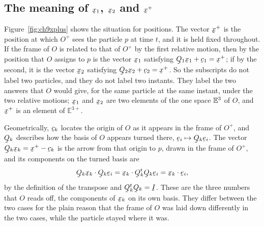 \subsection*{The meaning of $\bx_{1}$, $\bx_{2}$ and $\bx^{+}$}

Figure~\ref{fig:ch9xplus} shows the situation for positions. The vector
$\bx^{+}$ is the position at which $O^{+}$ sees the particle $p$ at time
$t$, and it is held fixed throughout. If the frame of $O$ is related to
that of $O^{+}$ by the first relative motion, then by  the
position that $O$ assigns to $p$ is the vector $\bx_{1}$ satisfying
$\bQ_{1}\bx_{1}+\bc_{1}=\bx^{+}$; if by the second, it is the vector
$\bx_{2}$ satisfying $\bQ_{2}\bx_{2}+\bc_{2}=\bx^{+}$. So the subscripts
do not label two particles, and they do not label two instants. They
label the two answers that $O$ would give, for the same particle at the
same instant, under the two relative motions; $\bx_{1}$ and $\bx_{2}$
are two elements of the one space $\mathbb{E}^{3}$ of $O$, and $\bx^{+}$ is an
element of $\mathbb{E}^{3+}$.

Geometrically, $\bc_{k}$ locates the origin of $O$ as it appears in the
frame of $O^{+}$, and $\bQ_{k}$ describes how the basis of $O$ appears
turned there, $\be_{i}\mapsto\bQ_{k}\be_{i}$. The vector $\bQ_{k}\bx_{k}
=\bx^{+}-\bc_{k}$ is the arrow from that origin to $p$, drawn in the
frame of $O^{+}$, and its components on the turned basis are
\[
   \ip{\bQ_{k}\bx_{k}}{\bQ_{k}\be_{i}}
   =\ip{\bx_{k}}{\bQ_{k}^{t}\bQ_{k}\be_{i}}
   =\ip{\bx_{k}}{\be_{i}},
\]
by the definition of the transpose and $\bQ_{k}^{t}\bQ_{k}=\I$. These are
the three numbers that $O$ reads off, the components of $\bx_{k}$ on its
own basis. They differ between the two cases for the plain reason that
the frame of $O$ was laid down differently in the two cases, while the
particle stayed where it was.

